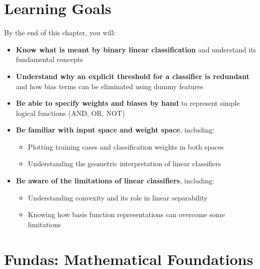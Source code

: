 \newtheorem{theorem}{Theorem}
\newtheorem{definition}{Definition}
\section{Learning Goals}

By the end of this chapter, you will:

\begin{itemize}
    \item \textbf{Know what is meant by binary linear classification} and understand its fundamental concepts
    \item \textbf{Understand why an explicit threshold for a classifier is redundant} and how bias terms can be eliminated using dummy features
    \item \textbf{Be able to specify weights and biases by hand} to represent simple logical functions (AND, OR, NOT)
    \item \textbf{Be familiar with input space and weight space}, including:
    \begin{itemize}
        \item Plotting training cases and classification weights in both spaces
        \item Understanding the geometric interpretation of linear classifiers
    \end{itemize}
    \item \textbf{Be aware of the limitations of linear classifiers}, including:
    \begin{itemize}
        \item Understanding convexity and its role in linear separability
        \item Knowing how basis function representations can overcome some limitations
    \end{itemize}
\end{itemize}

\section{Fundas: Mathematical Foundations}


